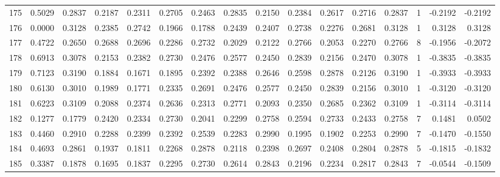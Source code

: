 \begin{tabular}{lrrrrrrrrrrrrrrr}
175 &      0.5029 &  0.2837 &  0.2187 &  0.2311 &  0.2705 &  0.2463 &  0.2835 &  0.2150 &  0.2384 &  0.2617 &   0.2716 &     0.2837 &      1 &                   -0.2192 &                    -0.2192 \\
176 &      0.0000 &  0.3128 &  0.2385 &  0.2742 &  0.1966 &  0.1788 &  0.2439 &  0.2407 &  0.2738 &  0.2276 &   0.2681 &     0.3128 &      1 &                    0.3128 &                     0.3128 \\
177 &      0.4722 &  0.2650 &  0.2688 &  0.2696 &  0.2286 &  0.2732 &  0.2029 &  0.2122 &  0.2766 &  0.2053 &   0.2270 &     0.2766 &      8 &                   -0.1956 &                    -0.2072 \\
178 &      0.6913 &  0.3078 &  0.2153 &  0.2382 &  0.2730 &  0.2476 &  0.2577 &  0.2450 &  0.2839 &  0.2156 &   0.2470 &     0.3078 &      1 &                   -0.3835 &                    -0.3835 \\
179 &      0.7123 &  0.3190 &  0.1884 &  0.1671 &  0.1895 &  0.2392 &  0.2388 &  0.2646 &  0.2598 &  0.2878 &   0.2126 &     0.3190 &      1 &                   -0.3933 &                    -0.3933 \\
180 &      0.6130 &  0.3010 &  0.1989 &  0.1771 &  0.2335 &  0.2691 &  0.2476 &  0.2577 &  0.2450 &  0.2839 &   0.2156 &     0.3010 &      1 &                   -0.3120 &                    -0.3120 \\
181 &      0.6223 &  0.3109 &  0.2088 &  0.2374 &  0.2636 &  0.2313 &  0.2771 &  0.2093 &  0.2350 &  0.2685 &   0.2362 &     0.3109 &      1 &                   -0.3114 &                    -0.3114 \\
182 &      0.1277 &  0.1779 &  0.2420 &  0.2334 &  0.2730 &  0.2041 &  0.2299 &  0.2758 &  0.2594 &  0.2733 &   0.2433 &     0.2758 &      7 &                    0.1481 &                     0.0502 \\
183 &      0.4460 &  0.2910 &  0.2288 &  0.2399 &  0.2392 &  0.2539 &  0.2283 &  0.2990 &  0.1995 &  0.1902 &   0.2253 &     0.2990 &      7 &                   -0.1470 &                    -0.1550 \\
184 &      0.4693 &  0.2861 &  0.1937 &  0.1811 &  0.2268 &  0.2878 &  0.2118 &  0.2398 &  0.2697 &  0.2408 &   0.2804 &     0.2878 &      5 &                   -0.1815 &                    -0.1832 \\
185 &      0.3387 &  0.1878 &  0.1695 &  0.1837 &  0.2295 &  0.2730 &  0.2614 &  0.2843 &  0.2196 &  0.2234 &   0.2817 &     0.2843 &      7 &                   -0.0544 &                    -0.1509 \\

\end{tabular}

